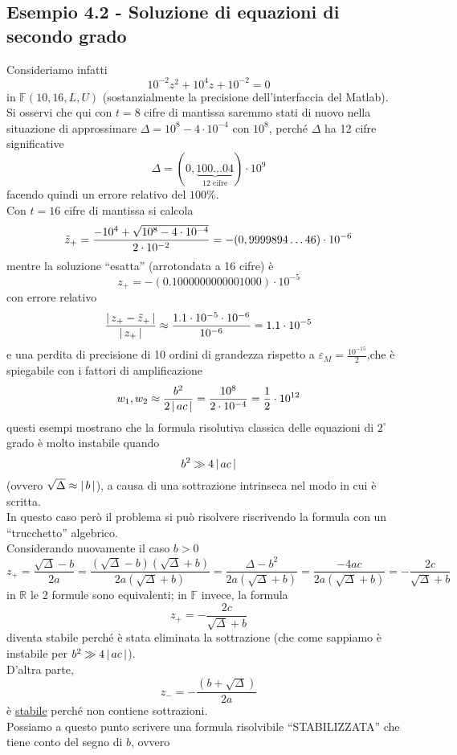 \documentclass[12pt]{article}
\DeclarePairedDelimiter{\abs}{\lvert}{\rvert}
\begin{document}
\subsection{Esempio 4.2 - Soluzione di equazioni di secondo grado}
Consideriamo infatti 
\[10^{-2}z^2 + 10^4z + 10^{-2} = 0\]
in $\mathbb{F}(10,16,L,U)$ (sostanzialmente la precisione dell'interfaccia del Matlab).\\
Si osservi che qui con $t=8$ cifre di mantissa saremmo stati di nuovo nella situazione di approssimare $\Delta = 10^8 - 4 \cdot 10^{-4}$ con $10^8$, perché $\Delta$ ha 12 cifre significative 
\[\Delta = (0,\underbrace{100 \dotsc 04}_{\text{12 cifre}}) \cdot 10^9\]
facendo quindi un errore relativo del $100\%$.\\
Con $t=16$ cifre di mantissa si calcola
\[\Tilde{z}_+ = \frac{-10^4 + \sqrt{10^8 - 4 \cdot 10^{-4}}}{2 \cdot 10^{-2}} = -(0,9999894 \dotsc 46) \cdot 10^{-6}\]
mentre la soluzione “esatta” (arrotondata a 16 cifre) è \[z_+ = -(0.1000000000001000)\cdot 10^{-5}\] con errore relativo
\[\frac{\abs{\,z_+ - \Tilde{z}_+\,}}{\abs{\,z_+\,}} \approx \frac{1.1 \cdot 10^{-5} \cdot 10^{-6}}{10^{-6}} = 1.1 \cdot 10^{-5}\]
e una perdita di precisione di 10 ordini di grandezza rispetto a $\varepsilon_M = \frac{10^{-15}}{2}$,che è spiegabile con i fattori di amplificazione
\[w_1,w_2 \approx \frac{b^2}{2\,\abs{\,ac\,}} = \frac{10^8}{2 \cdot 10^{-4}} = \frac{1}{2} \cdot 10^{12}\]
questi esempi mostrano che la formula risolutiva classica delle equazioni di $2^\circ$ grado è molto instabile quando \[b^2 \gg 4\,\abs{\,ac\,}\] 
(ovvero $\sqrt{\Delta} \approx \abs{\,b\,}$), a causa di una sottrazione intrinseca nel modo in cui è scritta.\\
In questo caso però il problema si può risolvere riscrivendo la formula con un “trucchetto” algebrico. \\
Considerando nuovamente il caso $b>0$ 
\[z_+ = \frac{\sqrt{\Delta}-b}{2a} = \frac{(\sqrt{\Delta}-b)(\sqrt{\Delta}+b)}{2a(\sqrt{\Delta}+b)} = \frac{\Delta -b^2}{2a(\sqrt{\Delta}+b)} = \frac{-4ac}{2a(\sqrt{\Delta}+b)} = - \frac{2c}{\sqrt{\Delta}+b}\] 
in $\mathbb{R}$ le 2 formule sono equivalenti; in $\mathbb{F}$ invece, la formula 
\[z_+ = - \frac{2c}{\sqrt{\Delta}+b}\]
diventa stabile perché è stata eliminata la sottrazione (che come sappiamo è instabile per $b^2 \gg 4\,\abs{\,ac\,}$). \\
D'altra parte, 
\[z_- = - \frac{(b+\sqrt{\Delta})}{2a}\]
è \uline{stabile} perché non contiene sottrazioni.\\
Possiamo a questo punto scrivere una formula risolvibile “STABILIZZATA” che tiene conto del segno di $b$, ovvero
\end{document}
